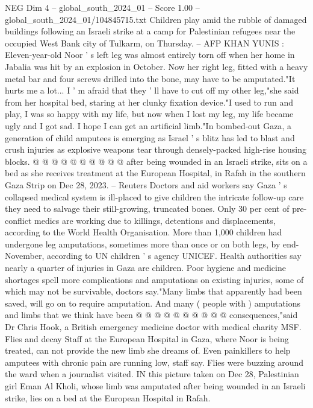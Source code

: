 \begin{textsample}{NEG Dim 4 – global\_south\_2024\_01 – Score 1.00 – global\_south\_2024\_01/104845715.txt}  \label{ex:f4_neg_087}
Children play amid the rubble of damaged buildings following an Israeli strike at a camp for Palestinian refugees near the occupied West Bank city of Tulkarm, on Thursday. -- AFP KHAN YUNIS : Eleven-year-old Noor ' s left leg was almost entirely torn off when her home in Jabalia was hit by an explosion in October.
Now her right leg, fitted with a heavy metal bar and four screws drilled into the bone, may have to be amputated."It hurts me a lot...
I ' m afraid that they ' ll have to cut off my other leg,"she said from her hospital bed, staring at her clunky fixation device."I used to run and play, I was so happy with my life, but now when I lost my leg, my life became ugly and I got sad.
I hope I can get an artificial limb."In bombed-out Gaza, a generation of child amputees is emerging as Israel ' s blitz has led to blast and crush injuries as explosive weapons tear through densely-packed high-rise housing blocks. @ @ @ @ @ @ @ @ @ @ after being wounded in an Israeli strike, sits on a bed as she receives treatment at the European Hospital, in Rafah in the southern Gaza Strip on Dec 28, 2023. -- Reuters Doctors and aid workers say Gaza ' s collapsed medical system is ill-placed to give children the intricate follow-up care they need to salvage their still-growing, truncated bones.
Only 30 per cent of pre-conflict medics are working due to killings, detentions and displacements, according to the World Health Organisation.
More than 1,000 children had undergone leg amputations, sometimes more than once or on both legs, by end-November, according to UN children ' s agency UNICEF.
Health authorities say nearly a quarter of injuries in Gaza are children.
Poor hygiene and medicine shortages spell more complications and amputations on existing injuries, some of which may not be survivable, doctors say."Many limbs that apparently had been saved, will go on to require amputation.
And many ( people with ) amputations and limbs that we think have been @ @ @ @ @ @ @ @ @ @ consequences,"said Dr Chris Hook, a British emergency medicine doctor with medical charity MSF.
Flies and decay Staff at the European Hospital in Gaza, where Noor is being treated, can not provide the new limb she dreams of.
Even painkillers to help amputees with chronic pain are running low, staff say.
Flies were buzzing around the ward when a journalist visited.
IN this picture taken on Dec 28, Palestinian girl Eman Al Kholi, whose limb was amputated after being wounded in an Israeli strike, lies on a bed at the European Hospital in Rafah.

\end{textsample}

